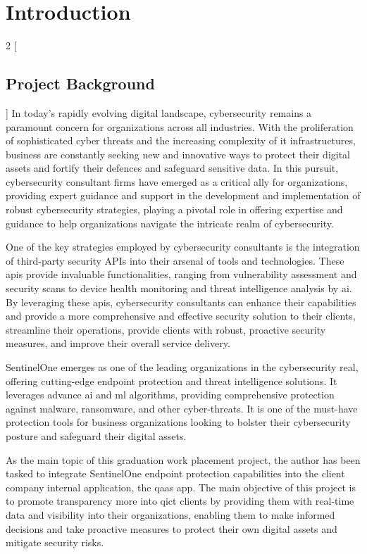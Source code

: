 \chapter{Introduction}
\begin{multicols}{2}
      [\section{Project Background}]
      In today's rapidly evolving digital landscape, cybersecurity remains a paramount concern for organizations
      across all industries. With the proliferation of sophisticated cyber threats and the increasing complexity of
      \acrshort{it} infrastructures, business are constantly seeking new and innovative ways to protect their
      digital assets and fortify their defences and safeguard sensitive data. In this pursuit, cybersecurity
      consultant firms have emerged as a critical ally for organizations, providing expert guidance and support in
      the development and implementation of robust cybersecurity strategies, playing a pivotal role in offering
      expertise and guidance to help organizations navigate the intricate realm of cybersecurity.

      One of the key strategies employed by cybersecurity consultants is the integration of third-party security
      \gls{API}s into their arsenal of tools and technologies. These \acrshort{api}s provide invaluable
      functionalities, ranging from vulnerability assessment and security scans to device health monitoring and
      threat intelligence analysis by \acrshort{ai}. By leveraging these \acrshort{api}s, cybersecurity consultants
      can enhance their capabilities and provide a more comprehensive and effective security solution to their
      clients, streamline their operations, provide clients with robust, proactive security measures, and improve
      their overall service delivery.

      SentinelOne emerges as one of the leading organizations in the cybersecurity real, offering cutting-edge
      endpoint protection and threat intelligence solutions. It leverages advance \acrshort{ai} and \acrshort{ml}
      algorithms, providing comprehensive protection against malware, ransomware, and other cyber-threats. It is one
      of the must-have protection tools for business organizations looking to bolster their cybersecurity posture
      and safeguard their digital assets.

      As the main topic of this graduation work placement project, the author
      has been tasked to integrate SentinelOne endpoint protection capabilities into the client company internal
      application, the \acrshort{qaas} app. The main objective of this project is to promote transparency more
      into \acrshort{qict} clients by providing them with real-time data and visibility into their organizations,
      enabling them to make informed decisions and take proactive measures to protect their own digital assets and
      mitigate security risks.


\end{multicols}

